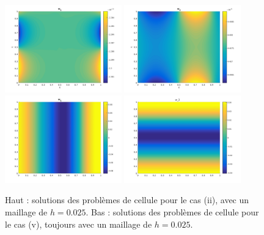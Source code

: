\documentclass[11pt]{article}
\begin{document}
\begin{figure}
  \centering
  \includegraphics[width=0.45\textwidth]{SolutionPbHomogeneise/w1}
  \includegraphics[width=0.45\textwidth]{SolutionPbHomogeneise/w2} \\
  \includegraphics[width=0.45\textwidth]{SolutionPbHomogeneise/w1_v}
  \includegraphics[width=0.45\textwidth]{SolutionPbHomogeneise/w2_v} \\ 
  \caption{Haut : solutions des problèmes de cellule pour le cas (ii), avec un maillage de $h=0.025$. Bas : solutions des problèmes de cellule pour le
    cas (v), toujours avec un maillage de $h=0.025$.}
  \label{fig:sol_pbcell}
\end{figure}
\end{document}
